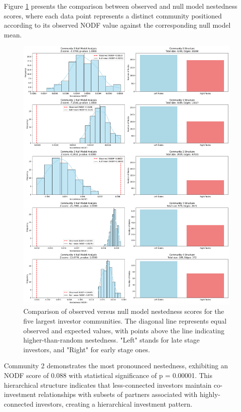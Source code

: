 Figure \ref{fig:nestedness_comparison} presents the comparison between observed and null model nestedness scores, where each data point represents a distinct community positioned according to its observed NODF value against the corresponding null model mean.

\begin{figure}[htbp]
\centering
\includegraphics[width=1\textwidth]{./assets/null-model-analysis-top-5.png}
\caption{Comparison of observed versus null model nestedness scores for the five largest investor communities. The diagonal line represents equal observed and expected values, with points above the line indicating higher-than-random nestedness. "Left" stands for late stage investors, and "Right" for early stage ones.}
\label{fig:nestedness_comparison}
\end{figure}

\newcommand{\interestingCommunity}{2}
\newcommand{\interestingCommunityNODF}{0.088}
\newcommand{\interestingCommunityPValue}{0.00001}

Community \interestingCommunity{} demonstrates the most pronounced nestedness, exhibiting an NODF score of \interestingCommunityNODF{} with statistical significance of p = \interestingCommunityPValue{}. This hierarchical structure indicates that less-connected investors maintain co-investment relationships with subsets of partners associated with highly-connected investors, creating a hierarchical investment pattern.

